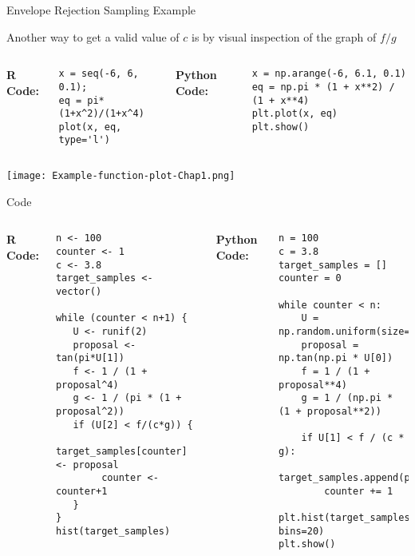 \documentclass[8pt]{beamer}
\begin{document}
\begin{frame}[fragile]{Envelope Rejection Sampling Example}

Another way to get a valid value of $c$ is by visual inspection of the graph of $f/g$

\vspace{2mm}

\begin{columns}
{\bf R Code:}
\begin{lstlisting}
x = seq(-6, 6, 0.1);
eq = pi*(1+x^2)/(1+x^4)
plot(x, eq, type='l')
\end{lstlisting}

{\bf Python Code:}
\begin{lstlisting}
x = np.arange(-6, 6.1, 0.1)
eq = np.pi * (1 + x**2) / (1 + x**4)
plt.plot(x, eq)
plt.show()
\end{lstlisting}
\end{columns}

\begin{center}
\texttt{[image: Example-function-plot-Chap1.png]}
\end{center}
\end{frame}

\begin{frame}[fragile]
\alert{Code}

\vspace{1mm}

\begin{columns}
{\bf R Code:}
\begin{lstlisting}
n <- 100
counter <- 1
c <- 3.8
target_samples <- vector()

while (counter < n+1) { 
   U <- runif(2)
   proposal <- tan(pi*U[1])
   f <- 1 / (1 + proposal^4)
   g <- 1 / (pi * (1 + proposal^2))
   if (U[2] < f/(c*g)) {
        target_samples[counter] <- proposal
        counter <- counter+1
   }
}
hist(target_samples)
\end{lstlisting}

{\bf Python Code:}
\begin{lstlisting}
n = 100
c = 3.8
target_samples = []
counter = 0

while counter < n:
    U = np.random.uniform(size=2)
    proposal = np.tan(np.pi * U[0])
    f = 1 / (1 + proposal**4)
    g = 1 / (np.pi * (1 + proposal**2))
    
    if U[1] < f / (c * g):
        target_samples.append(proposal)
        counter += 1

plt.hist(target_samples, bins=20)
plt.show()
\end{lstlisting}
\end{columns}
\end{frame}
\end{document}
